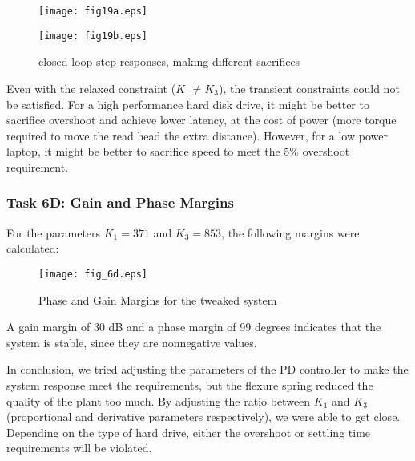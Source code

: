 \documentclass{article}
\newcommand{\matlab}[1]{%
%
}
\begin{document}
\begin{figure}\centering
  \begin{minipage}{0.5\linewidth}
    \matlab{fig19a.m}%
  \end{minipage}%
  \begin{minipage}{0.5\linewidth}
    \matlab{fig19b.m}
  \end{minipage}%
\end{figure}

\begin{figure}[H]\centering
  \caption{closed loop step responses, making different sacrifices}
  \begin{minipage}{9cm}
    \texttt{[image: fig19a.eps]}
  \end{minipage}%
  \begin{minipage}{9cm}
    \texttt{[image: fig19b.eps]}
  \end{minipage}
\end{figure}

Even with the relaxed constraint ($K_1 \neq K_3$), the transient
constraints could not be satisfied.  For a high performance hard disk
drive, it might be better to sacrifice overshoot and achieve lower
latency, at the cost of power (more torque required to move the read
head the extra distance).  However, for a low power laptop, it might
be better to sacrifice speed to meet the 5\% overshoot requirement.

\subsubsection*{Task 6D: Gain and Phase Margins}

For the parameters $K_1 = 371$ and $K_3 = 853$, the following margins
were calculated:

\begin{figure}[H]
  \caption{Phase and Gain Margins for the tweaked system}
  \centering
  \texttt{[image: fig\_6d.eps]}
\end{figure}

A gain margin of 30 dB and a phase margin of 99 degrees indicates that
the system is stable, since they are nonnegative values.

In conclusion, we tried adjusting the parameters of the PD controller
to make the system response meet the requirements, but the flexure
spring reduced the quality of the plant too much.  By adjusting the
ratio between $K_1$ and $K_3$ (proportional and derivative parameters
respectively), we were able to get close.  Depending on the type of
hard drive, either the overshoot or settling time requirements will be
violated.
\end{document}
